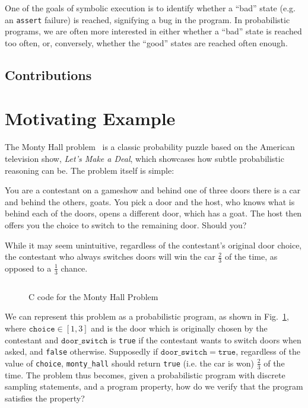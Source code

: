 \documentclass[acmsmall,review]{acmart}\settopmatter{}
\begin{document}
	One of the goals of symbolic execution is to identify whether a ``bad'' state (e.g. an \texttt{assert} failure) is reached, signifying a bug in the program.
	In probabilistic programs, we are often more interested in either whether a ``bad'' state is reached too often, or, conversely, whether the ``good'' states are reached often enough.
	
	
	\subsection{Contributions}
	\label{sec:contrib}
	
	\section{Motivating Example}
	\label{sec:motiv_example}
	
	The Monty Hall problem~\cite{selvin1975} is a classic probability puzzle based on the American television show, \textit{Let's Make a Deal}, which showcases how subtle probabilistic reasoning can be.
	The problem itself is simple:
	\begin{displayquote}
		You are a contestant on a gameshow and behind one of three doors there is a car and behind the others, goats.
		You pick a door and the host, who knows what is behind each of the doors, opens a different door, which has a goat.
		The host then offers you the choice to switch to the remaining door.
		Should you?
	\end{displayquote}
	While it may seem unintuitive, regardless of the contestant's original door choice, the contestant who always switches doors will win the car $\frac{2}{3}$ of the time, as opposed to a $\frac{1}{3}$ chance.
	
	
	\begin{figure}\centering
		\begin{multicols}{2}
			\inputminted[fontsize=\footnotesize,linenos]{c}{montyhall.c}
		\end{multicols}
		\caption{C code for the Monty Hall Problem}
		\label{fig:montyhall}
	\end{figure}
	
	
	We can represent this problem as a probabilistic program, as shown in Fig.~\ref{fig:montyhall}, where $\mathtt{choice} \in [1,3]$ and is the door which is originally chosen by the contestant and $\mathtt{door\_switch}$ is \texttt{true} if the contestant wants to switch doors when asked, and \texttt{false} otherwise.
	Supposedly if $\mathtt{door\_switch} = \mathtt{true}$, regardless of the value of \texttt{choice}, \texttt{monty\_hall} should return \texttt{true} (i.e. the car is won) $\frac{2}{3}$ of the time.
	The problem thus becomes, given a probabilistic program with discrete sampling statements, and a program property, how do we verify that the program satisfies the property?
	
\end{document}
